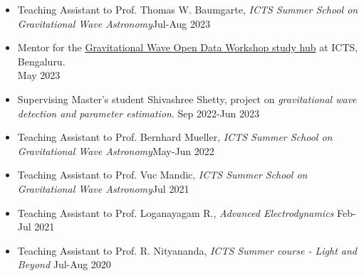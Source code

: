\begin{itemize}[noitemsep]
\item Teaching Assistant to Prof. Thomas W. Baumgarte, \textit{ICTS Summer School on Gravitational Wave Astronomy}\hfill{Jul-Aug 2023}
\item Mentor for the \href{https://www.icts.res.in/discussion-meeting/gwodw2023}{Gravitational Wave Open Data Workshop study hub} at ICTS, Bengaluru.\\ \hfill{May 2023}
\item Supervising Master's student Shivashree Shetty, project on \textit{gravitational wave detection and parameter estimation}. \hfill{Sep 2022-Jun 2023}
\item Teaching Assistant to Prof. Bernhard Mueller, \textit{ICTS Summer School on Gravitational Wave Astronomy}\hfill{May-Jun 2022}
\item Teaching Assistant to Prof. Vuc Mandic, \textit{ICTS Summer School on Gravitational Wave Astronomy}\hfill{Jul 2021}
\item Teaching Assistant to Prof. Loganayagam R., \textit{Advanced Electrodynamics} \hfill{Feb-Jul 2021}
\item Teaching Assistant to Prof. R. Nityananda, \textit{ICTS Summer course - Light and Beyond} \hfill{Jul-Aug 2020} 
\end{itemize}